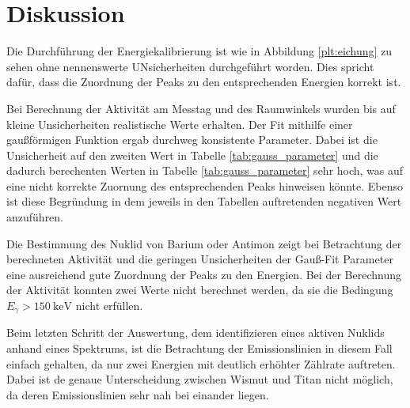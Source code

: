 \section{Diskussion}
\label{sec:Diskussion}
Die Durchführung der Energiekalibrierung ist wie in Abbildung \ref{plt:eichung}
zu sehen ohne nennenswerte UNsicherheiten durchgeführt worden. Dies spricht
dafür, dass die Zuordnung der Peaks zu den entsprechenden Energien korrekt ist.

Bei Berechnung der Aktivität am Messtag und des Raumwinkels wurden bis auf kleine
Unsicherheiten realistische Werte erhalten. Der Fit mithilfe einer gaußförmigen
Funktion ergab durchweg konsistente Parameter. Dabei ist die Unsicherheit auf
den zweiten Wert in Tabelle \ref{tab:gauss_parameter} und die dadurch
berechenten Werten in Tabelle \ref{tab:gauss_parameter} sehr hoch, was auf eine
nicht korrekte Zuornung des entsprechenden Peaks hinweisen könnte. Ebenso ist
diese Begründung in dem jeweils in den Tabellen auftretenden negativen Wert
anzuführen.

Die Bestimmung des Nuklid von Barium oder Antimon zeigt bei Betrachtung der
berechneten Aktivität und die geringen Unsicherheiten der Gauß-Fit Parameter
eine ausreichend gute Zuordnung der Peaks zu den Energien. Bei der Berechnung
der Aktivität konnten zwei Werte nicht berechnet werden, da sie die Bedingung
$E_\gamma > \SI{150}{\kilo\electronvolt}$ nicht erfüllen.


Beim letzten Schritt der Auswertung, dem identifizieren eines aktiven Nuklids
anhand eines Spektrums, ist die Betrachtung der Emissionslinien in diesem Fall
einfach gehalten, da nur zwei Energien mit deutlich erhöhter Zählrate auftreten.
Dabei ist de genaue Unterscheidung zwischen Wismut und Titan nicht möglich, da
deren Emissionslinien sehr nah bei einander liegen.
